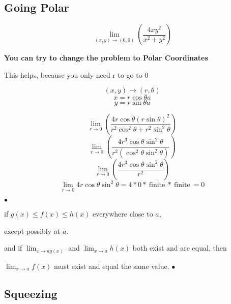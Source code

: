 \subsection{Going Polar}%
\label{sub:going_polar}


\begin{example}
	\[\lim_{(x,y) \to (0,0)}\left( \frac{4xy^2}{x^2+y^2} \right) \]

	\textbf{You can try to change the problem to Polar Coordinates}

	This helps, because you only need r to go to 0

	\[(x,y)\to(r,\theta)\]
	\[x = r \cos \theta a\]
	\[y = r \sin \theta a\]

	\[\lim_{r \to 0}\left( \frac{4r \cos \theta (r \sin \theta )^2}{r^2 \cos^2 \theta +r^2 \sin^2 \theta } \right) \]
	\[\lim_{r \to 0}\left( \frac{4r^3 \cos \theta \sin^2 \theta }{r^2 (\cos^2 \theta \sin^2 \theta) } \right) \]
	\[\lim_{r \to 0}\left( \frac{4r^3 \cos \theta \sin^2 \theta }{r^2 } \right) \]
	\[\lim_{r \to 0} 4r \cos \theta \sin^2 \theta = 4*0 * \:\text{finite}\: * \:\text{finite}\: = \boxed{0} \]

\smallskip\hfill$\bullet$\end{example}

\begin{definition}
	if $g(x)\le f(x) \le h(x)$ everywhere close to $a$,

	except possibly at $a$.

	and if $\lim_{x \to a g(x)}$ and $\lim_{x \to a} h(x)$ both exist and are equal, then

	$\lim_{x \to a} f(x) $ must exist and equal the same value.
\smallskip\hfill$\bullet$\end{definition}

\subsection{Squeezing}%
\label{sub:squeezing}


